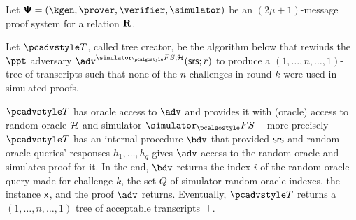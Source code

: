 \documentclass[runningheads,11pt]{llncs}
\begin{document}
\begin{definition}
  Let $\proofsystem = (\kgen, \prover, \verifier, \simulator)$ be an
  $(2 \mu + 1)$-message proof system for a relation $\mathbf{R}$.

  Let $\tdv$, called tree creator, be the
  algorithm below that rewinds the $\ppt$ adversary $\advse^{\simulator_\fs,
          \ro} (\srs; r)$ to produce a $(1,\dots, n,\dots, 1)$-tree of
  transcripts such that none of the $n$ challenges in round $k$ were used in
  simulated proofs.

  $\tdv$ has oracle access to $\adv$ and provides it with (oracle) access to
  random oracle $\mathcal{H}$ and simulator $\simulator_\fs$ -- more precisely $\tdv$
  has an internal procedure $\bdv$ that provided $\mathsf{srs}$ and random oracle
  queries' responses $h_1, \ldots, h_q$ gives $\adv$ access to the random oracle
  and simulates proof for it. In the end, $\bdv$ returns the index $i$ of the
  random oracle query made for challenge $k$, the set $Q$ of simulator random
  oracle indexes, the instance $\mathsf{x}$, and the proof $\adv$ returns. Eventually,
  $\tdv$ returns a $(1, \ldots, n, \dots, 1)$ tree of acceptable
  transcripts~$\mathsf{T}$.



\end{definition}
\end{document}
